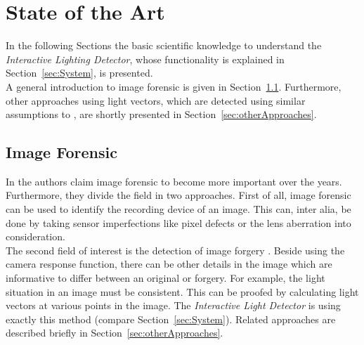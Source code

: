 \section{State of the Art} \label{sec:StateOfTheArt}
In the following Sections the basic scientific knowledge to understand the \textit{Interactive Lighting Detector}, whose functionality is explained in Section~\ref{sec:System}, is presented.\\
A general introduction to image forensic is given in Section~\ref{sec:imageForensic}.
Furthermore, other approaches using light vectors, which are detected using similar assumptions to \cite{Johnson}, are shortly presented in Section~\ref{sec:otherApproaches}.


\subsection{Image Forensic}\label{sec:imageForensic}

In \cite{4284575} the authors claim image forensic to become more important over the years. Furthermore, they divide the field in two approaches. First of all, image forensic can be used to identify the recording device of an image. This can, inter alia, be done by taking sensor imperfections like pixel defects or the lens aberration into consideration. \\
The second field of interest is the detection of image forgery \cite{4806202}. Beside using the camera response function, there can be other details in the image which are informative to differ between an original or forgery. For example, the light situation in an image must be consistent. This can be proofed by calculating light vectors at various points in the image. The \textit{Interactive Light Detector} is using exactly this method (compare Section~\ref{sec:System}). Related approaches are described briefly in Section~\ref{sec:otherApproaches}.


